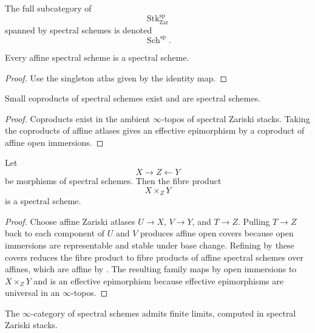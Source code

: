The full subcategory of
\[
    \operatorname{Stk}^{\mathrm{sp}}_{\mathrm{Zar}}
\]
spanned by spectral schemes is denoted
\[
    \operatorname{Sch}^{\mathrm{sp}}.
\]

\begin{proposition}
\label{prop:affines-are-spectral-schemes}
Every affine spectral scheme is a spectral scheme.
\end{proposition}

\begin{proof}
Use the singleton atlas given by the identity map.
\end{proof}

\begin{proposition}
\label{prop:spectral-schemes-coproducts}
Small coproducts of spectral schemes exist and are spectral schemes.
\end{proposition}

\begin{proof}
Coproducts exist in the ambient $\infty$-topos of spectral Zariski stacks.
Taking the coproducts of affine atlases gives an effective epimorphism by
a coproduct of affine open immersions.
\end{proof}

\begin{theorem}
\label{thm:spectral-schemes-fibre-products}
Let
\[
    X
    \longrightarrow
    Z
    \longleftarrow
    Y
\]
be morphisms of spectral schemes. Then the fibre product
\[
    X\times_ZY
\]
is a spectral scheme.
\end{theorem}

\begin{proof}
Choose affine Zariski atlases $U\to X$, $V\to Y$, and $T\to Z$. Pulling
$T\to Z$ back to each component of $U$ and $V$ produces affine open
covers because open immersions are representable and stable under base
change. Refining by these covers reduces the fibre product to fibre
products of affine spectral schemes over affines, which are affine by
. The resulting family maps by
open immersions to $X\times_ZY$ and is an effective epimorphism because
effective epimorphisms are universal in an $\infty$-topos.
\end{proof}

\begin{corollary}
\label{cor:spectral-schemes-finite-limits}
The $\infty$-category of spectral schemes admits finite limits, computed
in spectral Zariski stacks.
\end{corollary}

